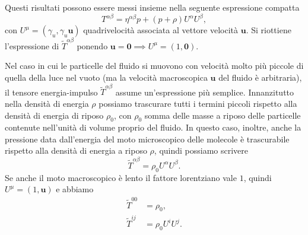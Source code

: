 Questi risultati possono essere messi insieme nella seguente espressione
compatta
\begin{equation}
  T^{\alpha\beta} = \eta^{\alpha\beta}p + (p + \rho)U^{\alpha}U^{\beta},
\end{equation}
con $U^{\mu} = (\gamma_{u}, \gamma_{u} \bm{u})$ quadrivelocità associata al
vettore velocità $\bm{u}$.  Si riottiene l'espressione di
$\tilde{T}^{\alpha\beta}$ ponendo
$\bm{u} = \bm{0} \implies U^{\mu} = (1, \bm{0})$.

Nel caso in cui le particelle del fluido si muovono con velocità molto più
piccole di quella della luce nel vuoto (ma la velocità macroscopica $\bm{u}$ del
fluido è arbitraria), il tensore energia-impulso $\tilde{T}^{\alpha\beta}$ assume
un'espressione più semplice.  Innanzitutto nella densità di energia $\rho$
possiamo trascurare tutti i termini piccoli rispetto alla densità di energia di
riposo $\rho_{0}$, con $\rho_{0}$ somma delle masse a riposo delle particelle
contenute nell'unità di volume proprio del fluido.  In questo caso, inoltre,
anche la pressione data dall'energia del moto microscopico delle molecole è
trascurabile rispetto alla densità di energia a riposo $\rho$, quindi possiamo
scrivere
\begin{equation}
  \tilde{T}^{\alpha\beta} = \rho_{0} U^{\alpha} U^{\beta}.
\end{equation}
Se anche il moto macroscopico è lento il fattore lorentziano vale $1$, quindi
$U^{\mu}= (1, \bm{u})$ e abbiamo
\begin{subequations}
  \begin{align}
    \tilde{T}^{00} &= \rho_{0}, \\
    \tilde{T}^{ij} &= \rho_{0} U^{i} U^{j}.
  \end{align}
\end{subequations}


